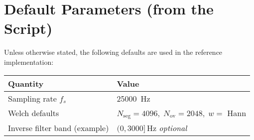 \documentclass[a4paper,11pt]{article}
\begin{document}
\section{Default Parameters (from the Script)}
Unless otherwise stated, the following defaults are used in the reference implementation:
\begin{center}
    \begin{tabular}{@{}ll@{}}
        \toprule
        Quantity & Value \\ \midrule
        Sampling rate $f_s$ & \SI{25000}{Hz} \\
        Welch defaults & $N_{\mathrm{seg}}{=}4096,\; N_{\mathrm{ov}}{=}2048,\; w{=}$ Hann \\
        Inverse filter band (example) & $(0, 3000]\,\mathrm{Hz}$ \emph{optional} \\ \bottomrule
    \end{tabular}
\end{center}

\end{document}
